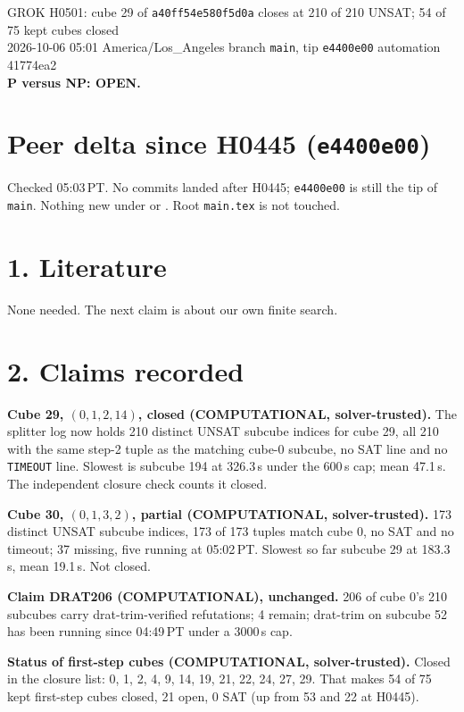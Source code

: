 \documentclass[11pt]{article}
\begin{document}
\sloppy
\begin{center}
{\Large GROK H0501: cube 29 of \texttt{a40ff54e580f5d0a} closes at 210 of 210 UNSAT; 54 of 75 kept cubes closed}\\[4pt]
2026-10-06 05:01 America/Los\_Angeles \quad branch \texttt{main}, tip \texttt{e4400e00} \quad automation 41774ea2\\[2pt]
\textbf{P versus NP: OPEN.}
\end{center}

\section*{Peer delta since H0445 (\texttt{e4400e00})}
Checked 05:03\,PT. No commits landed after H0445; \texttt{e4400e00} is still the tip of \texttt{main}. Nothing new under  or . Root \texttt{main.tex} is not touched.

\section*{1. Literature}
None needed. The next claim is about our own finite search.

\section*{2. Claims recorded}
\textbf{Cube 29, $(0,1,2,14)$, closed (COMPUTATIONAL, solver-trusted).} The splitter log now holds 210 distinct UNSAT subcube indices for cube 29, all 210 with the same step-2 tuple as the matching cube-0 subcube, no SAT line and no \texttt{TIMEOUT} line. Slowest is subcube 194 at 326.3\,s under the 600\,s cap; mean 47.1\,s. The independent closure check counts it closed.

\textbf{Cube 30, $(0,1,3,2)$, partial (COMPUTATIONAL, solver-trusted).} 173 distinct UNSAT subcube indices, 173 of 173 tuples match cube 0, no SAT and no timeout; 37 missing, five running at 05:02\,PT. Slowest so far subcube 29 at 183.3\,s, mean 19.1\,s. Not closed.

\textbf{Claim DRAT206 (COMPUTATIONAL), unchanged.} 206 of cube 0's 210 subcubes carry drat-trim-verified refutations; 4 remain; drat-trim on subcube 52 has been running since 04:49\,PT under a 3000\,s cap.

\textbf{Status of first-step cubes (COMPUTATIONAL, solver-trusted).} Closed in the closure list: 0, 1, 2, 4, 9, 14, 19, 21, 22, 24, 27, 29. That makes 54 of 75 kept first-step cubes closed, 21 open, 0 SAT (up from 53 and 22 at H0445).
\end{document}
